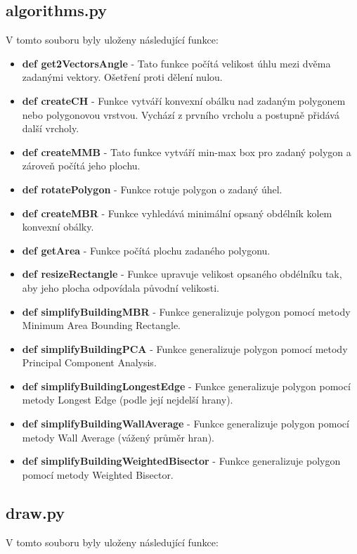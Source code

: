 \documentclass[12pt, a4paper]{article}
\begin{document}
\subsection*{algorithms.py}
\vspace{3mm}
V tomto souboru byly uloženy následující funkce:
\vspace{3mm}

\begin{itemize}
    \item \textbf{def get2VectorsAngle} - Tato funkce počítá velikost úhlu mezi dvěma zadanými vektory. Ošetření proti dělení nulou. 
    \item \textbf{def createCH} - Funkce vytváří konvexní obálku nad zadaným polygonem nebo polygonovou vrstvou. Vychází z prvního vrcholu a postupně přidává další vrcholy.
    \item \textbf{def createMMB} - Tato funkce vytváří min-max box pro zadaný polygon a zároveň počítá jeho plochu.
    \item \textbf{def rotatePolygon} - Funkce rotuje polygon o zadaný úhel. 
    \item \textbf{def createMBR} - Funkce vyhledává minimální opsaný obdélník kolem konvexní obálky.
    \item \textbf{def getArea} - Funkce počítá plochu zadaného polygonu. 
    \item \textbf{def resizeRectangle} - Funkce upravuje velikost opsaného obdélníku tak, aby jeho plocha odpovídala původní velikosti.
    \item \textbf{def simplifyBuildingMBR} - Funkce generalizuje polygon pomocí metody Minimum Area Bounding Rectangle.
    \item \textbf{def simplifyBuildingPCA} - Funkce generalizuje polygon pomocí metody Principal Component Analysis.
    \item \textbf{def simplifyBuildingLongestEdge} - Funkce generalizuje polygon pomocí metody Longest Edge (podle její nejdelší hrany).
    \item \textbf{def simplifyBuildingWallAverage} - Funkce generalizuje polygon pomocí metody Wall Average (vážený průměr hran).
    \item \textbf{def simplifyBuildingWeightedBisector} - Funkce generalizuje polygon pomocí metody Weighted Bisector. 
\end{itemize}

\newpage
\subsection*{draw.py}
\vspace{3mm}
V tomto souboru byly uloženy následující funkce:
\vspace{3mm}
\end{document}
